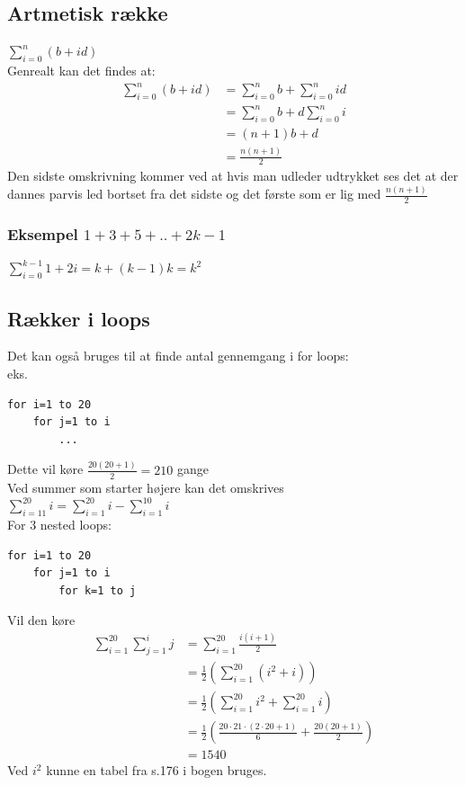 \documentclass[12pt, a4paper]{article}
\begin{document}
	\subsection{Artmetisk række}
		$\sum\limits_{i=0}^n(b+id)$\\
		Genrealt kan det findes at:
		\begin{align*}
			\sum\limits_{i=0}^n(b+id)&=\sum\limits_{i=0}^nb+\sum\limits_{i=0}^nid\\
						 &=\sum\limits_{i=0}^nb+d\sum_{i=0}^ni\\
						 &=(n+1)b+d\\
						 &=\frac{n(n+1)}{2}
		\end{align*}
		Den sidste omskrivning kommer ved at hvis man udleder udtrykket ses det at der dannes parvis led bortset fra det sidste og det første som er lig med $\frac{n(n+1)}{2}$
		\subsubsection{Eksempel $1+3+5+..+2k-1$}
			$\sum\limits_{i=0}^{k-1}1+2i=k+(k-1)k=k^2$
	\subsection{Rækker i loops}
		Det kan også bruges til at finde antal gennemgang i for loops:\\
		eks. 
		\begin{lstlisting}
for i=1 to 20
	for j=1 to i
		...
		\end{lstlisting}
		Dette vil køre $\frac{20(20+1)}{2}=210$ gange\\
		Ved summer som starter højere kan det omskrives\\
		$\sum\limits_{i=11}^{20}i=\sum\limits_{i=1}^{20}i-\sum\limits_{i=1}^{10}i$\\
		For 3 nested loops:
		\begin{lstlisting}
for i=1 to 20
	for j=1 to i
		for k=1 to j
		\end{lstlisting}
		Vil den køre 
		\begin{align*}
			\sum\limits_{i=1}^{20}\sum\limits_{j=1}^ij&=\sum\limits_{i=1}^{20}\frac{i(i+1)}{2}\\
								  &=\frac{1}{2}(\sum\limits_{i=1}^{20}(i^2+i))\\
								  &=\frac{1}{2}(\sum\limits_{i=1}^{20}i^2+\sum\limits_{i=1}^{20}i)\\
								  &=\frac{1}{2}(\frac{20\cdot 21\cdot (2\cdot 20+1)}{6}+\frac{20(20+1)}{2})\\
								  &=1540
		\end{align*}
		Ved $i^2$ kunne en tabel fra s.176 i bogen bruges.
\end{document}
